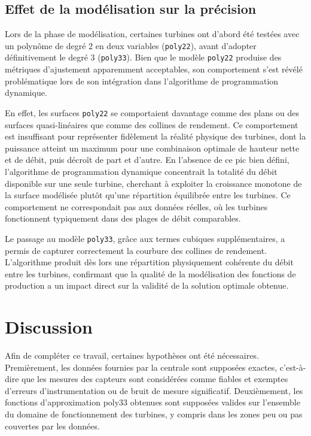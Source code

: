 \documentclass[12pt, letterpaper]{report}
\begin{document}
\section{Effet de la modélisation sur la précision}

Lors de la phase de modélisation, certaines turbines ont d'abord été testées avec un polynôme de degré 2 en deux variables (\texttt{poly22}), avant d'adopter définitivement le degré 3 (\texttt{poly33}). Bien que le modèle \texttt{poly22} produise des métriques d'ajustement apparemment acceptables, son comportement s'est révélé problématique lors de son intégration dans l'algorithme de programmation dynamique.

En effet, les surfaces \texttt{poly22} se comportaient davantage comme des plans ou des surfaces quasi-linéaires que comme des collines de rendement. Ce comportement est insuffisant pour représenter fidèlement la réalité physique des turbines, dont la puissance atteint un maximum pour une combinaison optimale de hauteur nette et de débit, puis décroît de part et d'autre. En l'absence de ce pic bien défini, l'algorithme de programmation dynamique concentrait la totalité du débit disponible sur une seule turbine, cherchant à exploiter la croissance monotone de la surface modélisée plutôt qu'une répartition équilibrée entre les turbines. Ce comportement ne correspondait pas aux données réelles, où les turbines fonctionnent typiquement dans des plages de débit comparables.

Le passage au modèle \texttt{poly33}, grâce aux termes cubiques supplémentaires, a permis de capturer correctement la courbure des collines de rendement. L'algorithme produit dès lors une répartition physiquement cohérente du débit entre les turbines, confirmant que la qualité de la modélisation des fonctions de production a un impact direct sur la validité de la solution optimale obtenue.

\chapter{Discussion}

Afin de compléter ce travail, certaines hypothèses ont été nécessaires. Premièrement, les données fournies par la centrale sont supposées exactes, c'est-à-dire que les mesures des capteurs sont considérées comme fiables et exemptes d'erreurs d'instrumentation ou de bruit de mesure significatif. Deuxièmement, les fonctions d'approximation poly33 obtenues sont supposées valides sur l'ensemble du domaine de fonctionnement des turbines, y compris dans les zones peu ou pas couvertes par les données.
\end{document}

